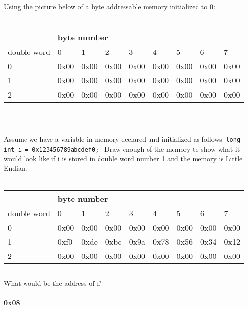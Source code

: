 \documentclass{article}
\begin{document}
\section{} 
\par{Using the picture below of a byte addressable memory initialized to 0:} \\ 
\\
\begin{tabular}{|l|l|l|l|l|l|l|l|l|}
\hline
 & \multicolumn{8}{|l|}{byte number} \\ \hline
double word & 0 & 1 & 2 & 3 & 4 & 5 & 6 & 7 \\ \hline
0 & 0x00 & 0x00 & 0x00 & 0x00 & 0x00 & 0x00 & 0x00 & 0x00 \\ \hline
1 & 0x00 & 0x00 & 0x00 & 0x00 & 0x00 & 0x00 & 0x00 & 0x00 \\ \hline
2 & 0x00 & 0x00 & 0x00 & 0x00 & 0x00 & 0x00 & 0x00 & 0x00 \\ \hline
\end{tabular}
\\
\pagebreak
\subsection{}
Assume we have a variable in memory declared and initialized as follows: 
\texttt{long int i = 0x123456789abcdef0; } 
Draw enough of the memory to show what it would look like if i is stored in double word number 1 and the memory is Little Endian.
\\
\\
\begin{tabular}{l|l|l|l|l|l|l|l|l|}
\cline{2-9}
 & \multicolumn{8}{|l|}{byte number} \\ \hline
\multicolumn{1}{|l|}{double word} & 0 & 1 & 2 & 3 & 4 & 5 & 6 & 7 \\ \hline
\multicolumn{1}{|l|}{0} & 0x00 & 0x00 & 0x00 & 0x00 & 0x00 & 0x00 & 0x00 & 0x00 \\ \hline
\multicolumn{1}{|l|}{1} & 0xf0 & 0xde & 0xbc & 0x9a & 0x78 & 0x56 & 0x34 & 0x12 \\ \hline
\multicolumn{1}{|l|}{2} & 0x00 & 0x00 & 0x00 & 0x00 & 0x00 & 0x00 & 0x00 & 0x00 \\ \hline
\end{tabular}
\subsection{}
What would be the address of i? \\
\\
\textbf{0x08}\\
\end{document}
